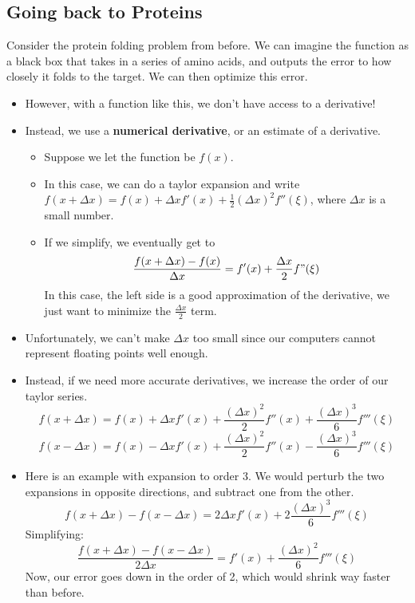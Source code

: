 \documentclass[10pt]{article}
\begin{document}
\subsection*{Going back to Proteins}
Consider the protein folding problem from before.  We can imagine the function as a black box that takes in a series of amino acids, and outputs the error to how closely it folds to the target.  We can then optimize this error.  
\begin{itemize}
	\item However, with a function like this, we don't have access to a derivative!
	\item Instead, we use a \textbf{numerical derivative}, or an estimate of a derivative.
	\begin{itemize}
	    \item Suppose we let the function be $f(x)$. 
	    \item In this case, we can do a taylor expansion and write $f(x + \Delta x) = f(x) + \Delta x f'(x) + \frac{1}{2} (\Delta x)^2 f''(\xi)$, where $\Delta x$ is a small number.
	    \item If we simplify, we eventually get to 
	    \[\frac{f(x + \Delta x) - f(x)}{\Delta x} = f'(x) + \frac{\Delta x}{2}f"(\xi)\]
        In this case, the left side is a good approximation of the derivative, we just want to minimize the $\frac{\Delta x}{2}$ term.
    \end{itemize}
    \item Unfortunately, we can't make $\Delta x$ too small since our computers cannot represent floating points well enough.
    \item Instead, if we need more accurate derivatives, we increase the order of our taylor series.
    \[f(x + \Delta x) = f(x) + \Delta x f'(x) + \frac{(\Delta x)^2}{2} f''(x) + \frac{(\Delta x)^3}{6} f'''(\xi)\]
    \[f(x - \Delta x) = f(x) - \Delta x f'(x) + \frac{(\Delta x)^2}{2} f''(x) - \frac{(\Delta x)^3}{6} f'''(\xi)\]
    \item Here is an example with expansion to order 3.  We would perturb the two expansions in opposite directions, and subtract one from the other.
    \[f(x + \Delta x) - f(x - \Delta x) = 2\Delta x f'(x) + 2 \frac{(\Delta x)^3}{6}f'''(\xi)\]
    Simplifying:
    \[\frac{f(x + \Delta x) - f(x - \Delta x)}{2\Delta x} = f'(x) + \frac{(\Delta x)^2}{6}f'''(\xi)\]
    Now, our error goes down in the order of 2, which would shrink way faster than before.
\end{itemize}
\end{document}
